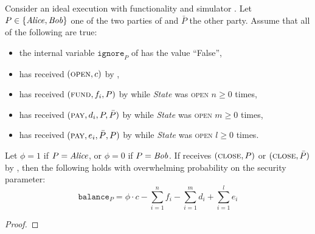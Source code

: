 \begin{lemma}
\label{lemma:ideal-balance}
  Consider an ideal execution with functionality \fchan and simulator
  \simulator.
  Let $P \in \{\mathit{Alice}, \mathit{Bob}\}$ one of the two parties of \fchan and $\bar{P}$
  the other party. Assume that all of the following are true:
  \begin{itemize}
    \item the internal variable $\texttt{ignore}_P$ of \fchan has the value
    ``False'',
    \item \fchan has received $(\textsc{open}, c)$ by \simulator,
    \item \fchan has received $(\textsc{fund}, f_i, P)$ by \simulator while
    \textit{State} was \textsc{open} $n \geq 0$ times,
    \item \fchan has received $(\textsc{pay}, d_i, P, \bar{P})$ by \simulator
    while \textit{State} was \textsc{open} $m \geq 0$ times,
    \item \fchan has received $(\textsc{pay}, e_i, \bar{P}, P)$ by \simulator
    while \textit{State} was \textsc{open} $l \geq 0$ times.
  \end{itemize}
  Let $\phi = 1$ if $P = \mathit{Alice}$, or $\phi = 0$ if $P = \mathit{Bob}$. If \fchan
  receives $(\textsc{close}, P)$ or $(\textsc{close}, \bar{P})$ by \simulator,
  then the following holds with overwhelming probability on the security
  parameter:
  \begin{equation}
    \texttt{balance}_P = \phi \cdot c - \sum\limits_{i=1}^n f_i -
    \sum\limits_{i=1}^m d_i + \sum\limits_{i=1}^l e_i
  \end{equation}
\end{lemma}

\begin{proof}
\end{proof}
